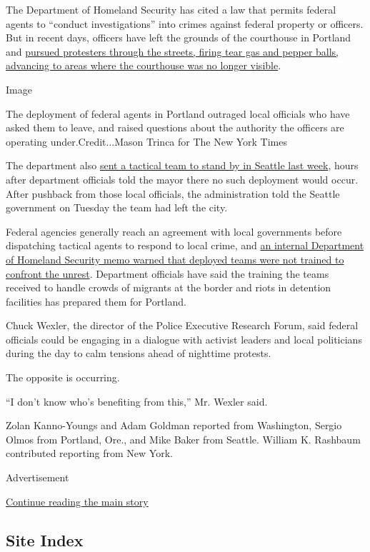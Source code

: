The Department of Homeland Security has cited a law that permits federal
agents to ``conduct investigations'' into crimes against federal
property or officers. But in recent days, officers have left the grounds
of the courthouse in Portland and
\href{https://www.nytimes.com/2020/07/25/us/portland-federal-legal-jurisdiction-courts.html}{pursued
protesters through the streets, firing tear gas and pepper balls,
advancing to areas where the courthouse was no longer visible}.

Image

The deployment of federal agents in Portland outraged local officials
who have asked them to leave, and raised questions about the authority
the officers are operating under.Credit...Mason Trinca for The New York
Times

The department also
\href{https://www.nytimes.com/2020/07/23/us/seattle-protests-feds.html}{sent
a tactical team to stand by in Seattle last week}, hours after
department officials told the mayor there no such deployment would
occur. After pushback from those local officials, the administration
told the Seattle government on Tuesday the team had left the city.

Federal agencies generally reach an agreement with local governments
before dispatching tactical agents to respond to local crime, and
\href{https://www.nytimes.com/2020/07/18/us/portland-protests.html}{an
internal Department of Homeland Security memo warned that deployed teams
were not trained to confront the unrest}. Department officials have said
the training the teams received to handle crowds of migrants at the
border and riots in detention facilities has prepared them for Portland.

Chuck Wexler, the director of the Police Executive Research Forum, said
federal officials could be engaging in a dialogue with activist leaders
and local politicians during the day to calm tensions ahead of nighttime
protests.

The opposite is occurring.

``I don't know who's benefiting from this,'' Mr. Wexler said.

Zolan Kanno-Youngs and Adam Goldman reported from Washington, Sergio
Olmos from Portland, Ore., and Mike Baker from Seattle. William K.
Rashbaum contributed reporting from New York.

Advertisement

\protect\hyperlink{after-bottom}{Continue reading the main story}

\hypertarget{site-index}{%
\subsection{Site Index}\label{site-index}}

